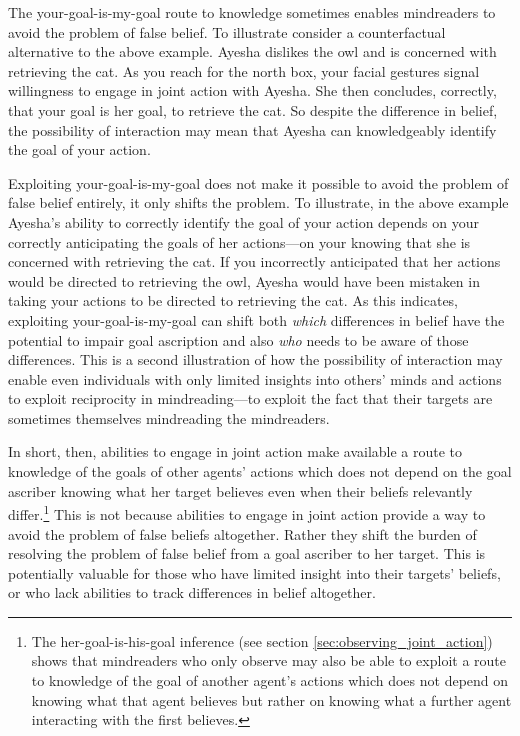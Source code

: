 \documentclass[12pt,\papersize]{extarticle}
\begin{document}
The your-goal-is-my-goal
route to knowledge
sometimes enables mindreaders to avoid the problem of false belief.
To illustrate consider a counterfactual alternative to the above example.
Ayesha dislikes the owl and is concerned with retrieving the cat.
As you reach for the north box,
your facial gestures signal willingness to engage in joint action with Ayesha.
She then concludes, correctly, that your goal is her goal, to retrieve the cat.
So despite the difference in belief,
the possibility of interaction may mean that
Ayesha can knowledgeably identify the goal of your action.

Exploiting your-goal-is-my-goal does not make it possible to  avoid the problem of false belief entirely,
it only shifts  the problem.
To illustrate,
in the above example Ayesha's ability to correctly identify the goal of your action
depends on your correctly anticipating the goals of her actions---on your knowing that she is concerned with retrieving the cat.
If you incorrectly anticipated that her actions would be directed to retrieving the owl,
Ayesha would have been mistaken in taking your actions to be directed to retrieving the cat.
As this indicates,
exploiting your-goal-is-my-goal 
can shift 
both 
\emph{which} differences in belief have the potential to impair  goal ascription
and also 
\emph{who} needs to be aware of those differences.
This is a second illustration of how the possibility of interaction 
may enable 
	even individuals with only limited insights into others' minds and actions
 	to exploit reciprocity in mindreading---to exploit the fact that their targets are sometimes themselves mindreading the mindreaders.

In short, then, abilities to engage in joint action make available a route to knowledge of the goals of other agents' actions which does not depend on the goal ascriber knowing what her target believes even when their beliefs relevantly differ.\footnote{
The her-goal-is-his-goal inference (see section \vref{sec:observing_joint_action}) 
shows that mindreaders who only observe may also be able to exploit a route to knowledge of the goal of another agent's actions which does not depend on knowing what that agent believes but rather on knowing what a further agent interacting with the first believes.
}
This is not because abilities to engage in joint action provide a way to avoid the problem of false beliefs altogether.
Rather they shift the burden of resolving the problem of false belief from a goal ascriber to her target.
This is potentially valuable for those who have limited insight into their targets' beliefs,
or who lack abilities to track differences in belief altogether.
\end{document}
